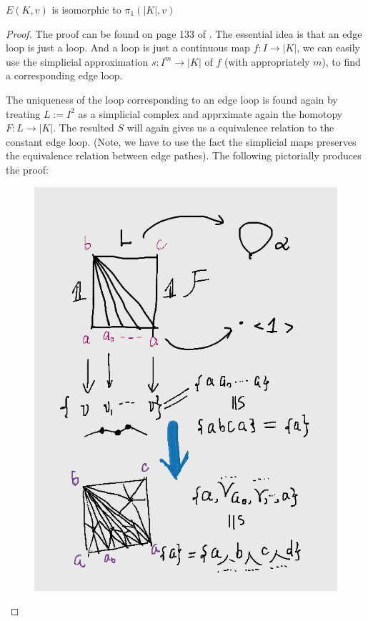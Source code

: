 \begin{thm}
    $E(K,v)$ is isomorphic to $\pi_1(|K|,v)$
\end{thm}
\begin{proof}
    The proof can be found on page 133 of \cite{book}. The essential
    idea is that an edge loop is just a loop. And a loop is just a
    continuous map $f:I\to |K|$, we can easily use the simplicial
    approximation $s:I^m\to |K|$ of $f$ (with appropriately $m$), to
    find a corresponding edge loop.

    The uniqueness of the loop corresponding to an edge loop is found
    again by treating $L:=I^2$ as a simplicial complex and apprximate
    again the homotopy $F:L\to |K|$. The resulted $S$ will again gives
    us a equivalence relation to the constant edge loop. (Note, we
    have to use the fact the simplicial maps preserves the equivalence
    relation between edge pathes). The following pictorially
    produces the proof:
    \begin{figure}[H]
        \centering
        \includegraphics[width=0.9\linewidth]{pics/ch6-notes-2/L.png}
    \end{figure}
\end{proof}

